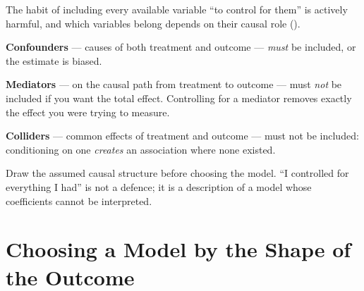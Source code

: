 \begin{alertbox}
The habit of including every available variable ``to control for them'' is
actively harmful, and which variables belong depends on their causal role
().

\begin{tight}
  \item \textbf{Confounders} --- causes of both treatment and outcome ---
    \emph{must} be included, or the estimate is biased.
  \item \textbf{Mediators} --- on the causal path from treatment to outcome ---
    must \emph{not} be included if you want the total effect. Controlling for a
    mediator removes exactly the effect you were trying to measure.
  \item \textbf{Colliders} --- common effects of treatment and outcome ---
    must not be included: conditioning on one \emph{creates} an association
    where none existed.
\end{tight}

\medskip
Draw the assumed causal structure before choosing the model. ``I controlled for
everything I had'' is not a defence; it is a description of a model whose
coefficients cannot be interpreted.
\end{alertbox}

\section{Choosing a Model by the Shape of the Outcome}

